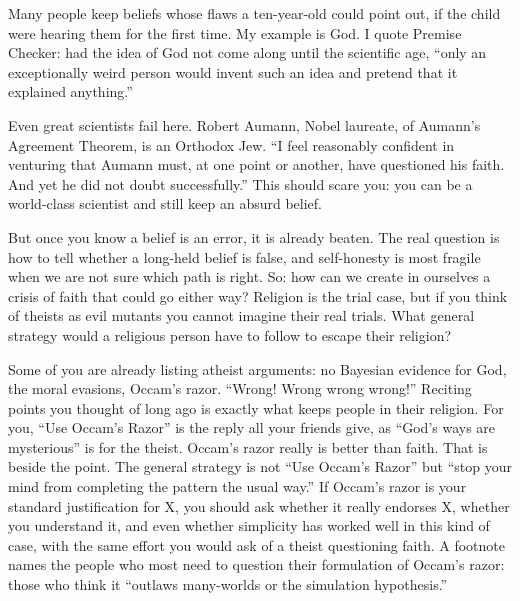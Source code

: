 
Many people keep beliefs whose flaws a ten-year-old could point out, if the child were hearing them for the first time. My example is God. I quote Premise Checker: had the idea of God not come along until the scientific age, ``only an exceptionally weird person would invent such an idea and pretend that it explained anything.''

Even great scientists fail here. Robert Aumann, Nobel laureate, of Aumann's Agreement Theorem, is an Orthodox Jew. ``I feel reasonably confident in venturing that Aumann must, at one point or another, have questioned his faith. And yet he did not doubt successfully.''  This should scare you: you can be a world-class scientist and still keep an absurd belief. 

But once you know a belief is an error, it is already beaten. The real question is how to tell whether a long-held belief is false, and self-honesty is most fragile when we are not sure which path is right. So: how can we create in ourselves a crisis of faith that could go either way? Religion is the trial case, but if you think of theists as evil mutants you cannot imagine their real trials. What general strategy would a religious person have to follow to escape their religion?

Some of you are already listing atheist arguments: no Bayesian evidence for God, the moral evasions, Occam's razor. ``Wrong! Wrong wrong wrong!'' Reciting points you thought of long ago is exactly what keeps people in their religion. For you, ``Use Occam's Razor'' is the reply all your friends give, as ``God's ways are mysterious'' is for the theist. Occam's razor really is better than faith. That is beside the point. The general strategy is not ``Use Occam's Razor'' but ``stop your mind from completing the pattern the usual way.'' If Occam's razor is your standard justification for X, you should ask whether it really endorses X, whether you understand it, and even whether simplicity has worked well in this kind of case, with the same effort you would ask of a theist questioning faith. A footnote names the people who most need to question their formulation of Occam's razor: those who think it ``outlaws many-worlds or the simulation hypothesis.'' 

